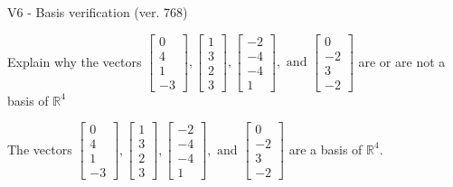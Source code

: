 \begin{exercise}
  \begin{exerciseTitle}V6 - Basis verification (ver. 768)\end{exerciseTitle}
  \begin{exerciseStatement}
    Explain why the vectors \(\left[\begin{array}{r}
0 \\
4 \\
1 \\
-3
\end{array}\right] , \left[\begin{array}{r}
1 \\
3 \\
2 \\
3
\end{array}\right] , \left[\begin{array}{r}
-2 \\
-4 \\
-4 \\
1
\end{array}\right] , \text{ and } \left[\begin{array}{r}
0 \\
-2 \\
3 \\
-2
\end{array}\right]\) are or are not a basis of \(\mathbb{R}^4\)	


  \end{exerciseStatement}
  \begin{exerciseAnswer}
   The vectors \(\left[\begin{array}{r}
0 \\
4 \\
1 \\
-3
\end{array}\right] , \left[\begin{array}{r}
1 \\
3 \\
2 \\
3
\end{array}\right] , \left[\begin{array}{r}
-2 \\
-4 \\
-4 \\
1
\end{array}\right] , \text{ and } \left[\begin{array}{r}
0 \\
-2 \\
3 \\
-2
\end{array}\right]\) 
  	 are  a basis of \(\mathbb{R}^4\).
  


  \end{exerciseAnswer}
\end{exercise}